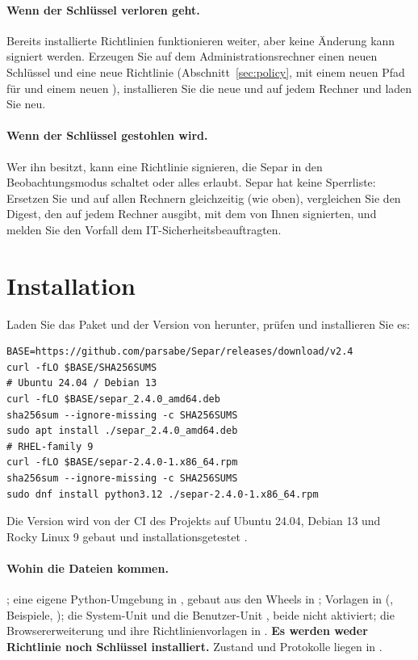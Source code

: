 \documentclass[11pt,a4paper]{article}
\begin{document}
\paragraph{Wenn der Schlüssel verloren geht.} Bereits installierte Richtlinien funktionieren
weiter, aber keine Änderung kann signiert werden. Erzeugen Sie auf dem Administrationsrechner einen
neuen Schlüssel und eine neue Richtlinie (Abschnitt~\ref{sec:policy}, mit einem neuen Pfad für
 und einem neuen ), installieren Sie die neue  und
 auf jedem Rechner und laden Sie neu.

\paragraph{Wenn der Schlüssel gestohlen wird.} Wer ihn besitzt, kann eine Richtlinie signieren,
die Separ in den Beobachtungsmodus schaltet oder alles erlaubt. Separ hat keine Sperrliste:
Ersetzen Sie  und  auf allen Rechnern gleichzeitig (wie oben),
vergleichen Sie den Digest, den  auf jedem Rechner ausgibt, mit dem von
Ihnen signierten, und melden Sie den Vorfall dem IT-Sicherheitsbeauftragten.

\section{Installation}
\label{sec:install}
Laden Sie das Paket und  der Version von \releases{} herunter, prüfen und
installieren Sie es:
\begin{lstlisting}
BASE=https://github.com/parsabe/Separ/releases/download/v2.4
curl -fLO $BASE/SHA256SUMS
# Ubuntu 24.04 / Debian 13
curl -fLO $BASE/separ_2.4.0_amd64.deb
sha256sum --ignore-missing -c SHA256SUMS
sudo apt install ./separ_2.4.0_amd64.deb
# RHEL-family 9
curl -fLO $BASE/separ-2.4.0-1.x86_64.rpm
sha256sum --ignore-missing -c SHA256SUMS
sudo dnf install python3.12 ./separ-2.4.0-1.x86_64.rpm
\end{lstlisting}
Die Version wird von der CI des Projekts auf Ubuntu 24.04, Debian 13 und Rocky Linux 9 gebaut und
installationsgetestet .

\paragraph{Wohin die Dateien kommen.} ; eine eigene Python-Umgebung in
, gebaut aus den Wheels in ; Vorlagen in
 (, Beispiele, ); die System-Unit
 und die Benutzer-Unit
, beide nicht aktiviert; die Browsererweiterung und
ihre Richtlinienvorlagen in . \textbf{Es werden weder Richtlinie noch
Schlüssel installiert.} Zustand und Protokolle liegen in .
\end{document}
